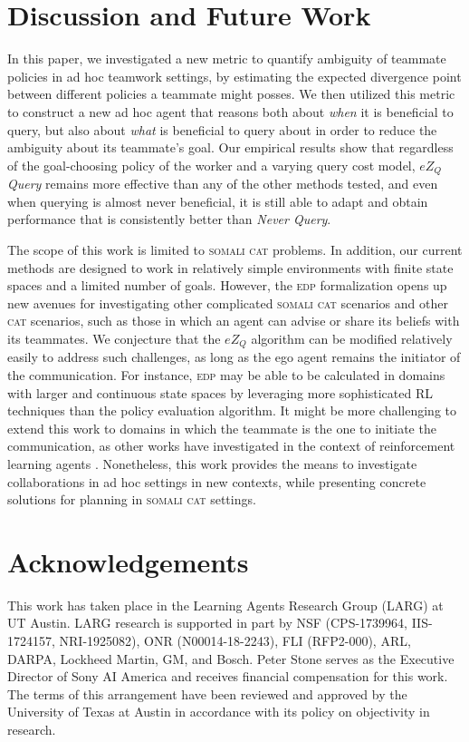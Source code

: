 \documentclass[letterpaper]{article}
\begin{document}
\section{Discussion and Future Work}
In this paper, we investigated a new metric to quantify ambiguity of teammate policies in ad hoc teamwork settings, by estimating the expected divergence point between different policies a teammate might posses. We then utilized this metric to construct a new ad hoc agent that reasons both about \emph{when} it is beneficial to query, but also about \emph{what} is beneficial to query about in order to reduce the ambiguity about its teammate's goal. Our empirical results show that regardless of the goal-choosing policy of the worker and a varying query cost model, \emph{$eZ_Q$ Query} remains more effective than any of the other methods tested, and even when querying is almost never beneficial, it is still able to adapt and obtain performance that is consistently better than \emph{Never Query}.

The scope of this work is limited to \textsc{somali cat} problems. In addition, our current methods are designed to work in relatively simple environments with finite state spaces and a limited number of goals. However, the \textsc{edp} formalization opens up new avenues for investigating other %
complicated \textsc{somali cat} scenarios and other \textsc{cat} scenarios, such as those in which an agent can advise or share its beliefs with its teammates. We conjecture that the $eZ_Q$ algorithm can be modified relatively easily to address such challenges, as long as the ego agent remains the initiator of the communication. For instance, \textsc{edp} may be able to be calculated in domains with larger and continuous state spaces by leveraging more sophisticated RL techniques than the policy evaluation algorithm. It might be more challenging to extend this work to domains in which the teammate is the one to initiate the communication, as other works have investigated in the context of reinforcement learning agents \cite{torrey2013teaching,cui2018active}. Nonetheless, this work provides the means to investigate collaborations in ad hoc settings in new contexts, while presenting concrete solutions for planning in \textsc{somali cat} settings. 

\section*{Acknowledgements}
This work has taken place in the Learning Agents Research
Group (LARG) at UT Austin.  LARG research is supported in part by NSF
(CPS-1739964, IIS-1724157, NRI-1925082), ONR (N00014-18-2243), FLI
(RFP2-000), ARL, DARPA, Lockheed Martin, GM, and Bosch.  Peter Stone
serves as the Executive Director of Sony AI America and receives
financial compensation for this work.  The terms of this arrangement
have been reviewed and approved by the University of Texas at Austin
in accordance with its policy on objectivity in research.
\end{document}
